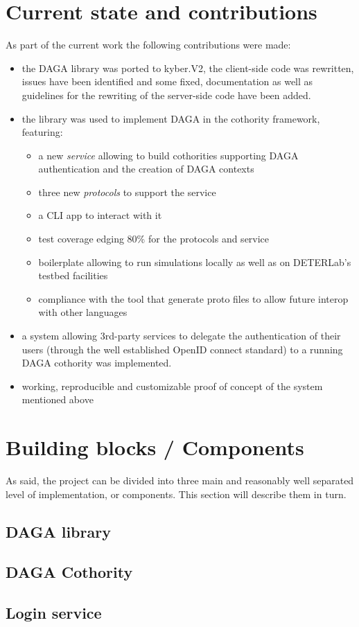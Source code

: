     \section{Current state and contributions}
    As part of the current work the following contributions were made:
    \begin{itemize}
        \item the DAGA library was ported to kyber.V2, the client-side code was rewritten, issues have been identified and some fixed,
                documentation as well as guidelines for the rewriting of the server-side code have been added.
        \item the library was used to implement DAGA in the cothority framework, featuring:\newline
            \begin{itemize}
                \item a new \emph{service} allowing to build cothorities supporting DAGA authentication and the creation of DAGA contexts
                \item three new \emph{protocols} to support the service
                \item a CLI app to interact with it
                \item test coverage edging 80\% for the protocols and service
                \item boilerplate allowing to run simulations locally as well as on DETERLab's testbed facilities
                \item compliance with the tool that generate proto files to allow future interop with other languages
            \end{itemize}
        \item a system allowing 3rd-party services to delegate the authentication of their users (through the well established OpenID connect standard)
            to a running DAGA cothority was implemented.
        \item working, reproducible and customizable proof of concept of the system mentioned above
    \end{itemize}

    \section{Building blocks / Components}
    \label{sec:components}
    As said, the project can be divided into three main and reasonably well separated level of implementation, or components.
    This section will describe them in turn.

    \subsection{DAGA library}
    \label{subsec:library}
    

    \subsection{DAGA Cothority}
    \label{subsec:cothority}
    
    \newpage

    \subsection{Login service}
    \label{subsec:loginservice}
    
